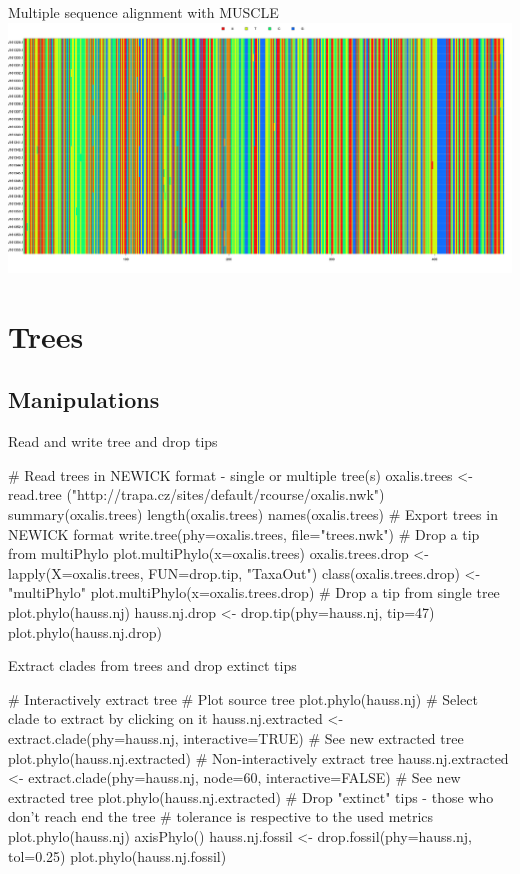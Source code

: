\documentclass[compress, ucs, xelatex, 11pt, xcolor=svgnames,
  hyperref={
    bookmarks=true,
    unicode=true,
    colorlinks=true,
    pdftitle={Molecular data in R},
    plainpages=false,
    pdfauthor={Vojtech Zeisek},
    pdfsubject={Course about phylogeny and evolution in R},
    pdfcreator={XeLaTeX},
    pdfkeywords={R, evolution, phylogeny, molecular data},
    linkcolor=Tomato,
    anchorcolor=SaddleBrown,
    citecolor=Goldenrod,
    filecolor=DarkMagenta,
    menucolor=Sienna,
    urlcolor=DarkTurquoise,
    pdftex},
  url={hyphens, lowtilde} %
  ]{beamer}
\begin{document}
\begin{frame}{Multiple sequence alignment with MUSCLE}
\includegraphics[width=\textwidth]{muscle.png}
\end{frame}

\section{Trees}

\subsection{Manipulations}

\begin{frame}[fragile]{Read and write tree and drop tips}
  \begin{spluscode}
    # Read trees in NEWICK format - single or multiple tree(s)
    oxalis.trees <- read.tree
      ("http://trapa.cz/sites/default/rcourse/oxalis.nwk")
    summary(oxalis.trees)
    length(oxalis.trees)
    names(oxalis.trees)
    # Export trees in NEWICK format
    write.tree(phy=oxalis.trees, file="trees.nwk")
    # Drop a tip from multiPhylo
    plot.multiPhylo(x=oxalis.trees)
    oxalis.trees.drop <- lapply(X=oxalis.trees, FUN=drop.tip, "TaxaOut")
    class(oxalis.trees.drop) <- "multiPhylo"
    plot.multiPhylo(x=oxalis.trees.drop)
    # Drop a tip from single tree
    plot.phylo(hauss.nj)
    hauss.nj.drop <- drop.tip(phy=hauss.nj, tip=47)
    plot.phylo(hauss.nj.drop)
  \end{spluscode}
\end{frame}

\begin{frame}[fragile]{Extract clades from trees and drop extinct tips}
  \begin{spluscode}
    # Interactively extract tree
    # Plot source tree
    plot.phylo(hauss.nj)
    # Select clade to extract by clicking on it
    hauss.nj.extracted <- extract.clade(phy=hauss.nj, interactive=TRUE)
    # See new extracted tree
    plot.phylo(hauss.nj.extracted)
    # Non-interactively extract tree
    hauss.nj.extracted <- extract.clade(phy=hauss.nj, node=60,
      interactive=FALSE)
    # See new extracted tree
    plot.phylo(hauss.nj.extracted)
    # Drop "extinct" tips - those who don't reach end the tree
    # tolerance is respective to the used metrics
    plot.phylo(hauss.nj)
    axisPhylo()
    hauss.nj.fossil <- drop.fossil(phy=hauss.nj, tol=0.25)
    plot.phylo(hauss.nj.fossil)
  \end{spluscode}
\end{frame}
\end{document}
